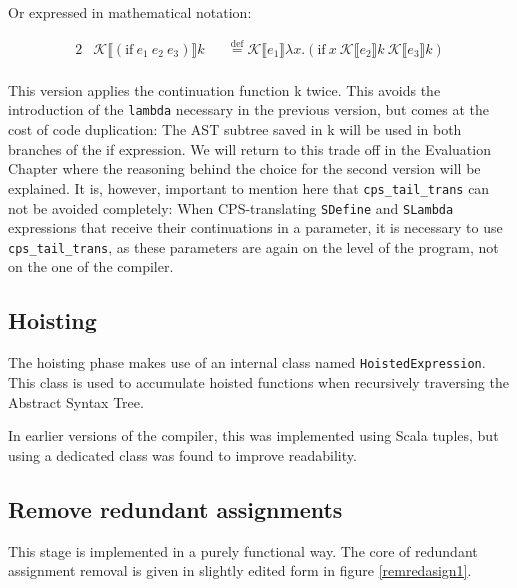 \documentclass[11pt]{report}
\newcommand{\eqdef}{\stackrel{\text{def}}{=}}%
\newcommand{\cpstrans}[1]{\ensuremath{\mathcal{K}\llbracket #1 \rrbracket}}
\begin{document}
Or expressed in mathematical notation:

\begin{alignat*}{2}
&\cpstrans{(\text{if}\ e_1\ e_2\ e_3)} k &&\eqdef \cpstrans{e_1} \lambda x.(\text{if}\ x\ \cpstrans{e_2}k\ \cpstrans{e_3}k) \\
\end{alignat*}

This version applies the continuation function k twice. This avoids the introduction of the \texttt{lambda} necessary in the previous version, but comes at the cost of code duplication: The AST subtree saved in k will be used in both branches of the if expression. We will return to this trade off in the Evaluation Chapter where the reasoning behind the choice for the second version will be explained. It is, however, important to mention here that \texttt{cps_tail_trans} can not be avoided completely: When CPS-translating \texttt{SDefine} and \texttt{SLambda} expressions that receive their continuations in a parameter, it is necessary to use \texttt{cps_tail_trans}, as these parameters are again on the level of the program, not on the one of the compiler.


\subsection{Hoisting}
The hoisting phase makes use of an internal class named \texttt{HoistedExpression}. This class is used to accumulate hoisted functions when recursively traversing the Abstract Syntax Tree.

In earlier versions of the compiler, this was implemented using Scala tuples, but using a dedicated class was found to improve readability. 



\subsection{Remove redundant assignments}
This stage is implemented in a purely functional way. The core of redundant assignment removal is given in slightly edited form in figure \ref{remredasign1}.
\end{document}
